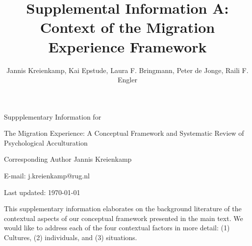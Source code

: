 \documentclass[man, 12pt, a4paper]{apa7}
\title{Supplemental Information A: Context of the Migration Experience Framework}
\author{Jannis Kreienkamp, Kai Epstude, Laura F. Bringmann, Peter de Jonge, Raili F. Engler}
\begin{document}
\begin{titlepage}
	{\noindent\Large Suppplementary Information for \par}
	\vspace{0.5cm}
	{\noindent\Large The Migration Experience: A Conceptual Framework and Systematic Review of Psychological Acculturation\par}
	\vspace{1.5cm}
	{\noindent\LARGE\bfseries \thetitle \par}
	\vspace{2cm}
	{\noindent\Large\itshape \theauthor \par}
	\vfill
	\noindent Corresponding Author Jannis Kreienkamp\par
	\noindent E-mail: j.kreienkamp@rug.nl\par
	\vfill

	{\noindent Last updated: \today\par}
\end{titlepage}

\begin{center}
   \textbf{\thetitle} 
\end{center}

This supplementary information elaborates on the background literature of the contextual aspects of our conceptual framework presented in the main text. We would like to address each of the four contextual factors in more detail: (1) Cultures, (2) individuals, and (3) situations.
\end{document}
